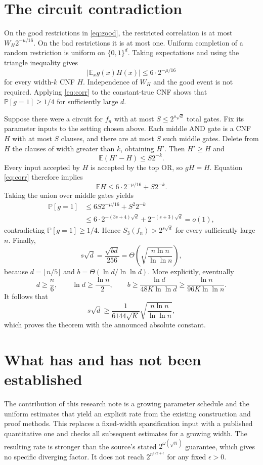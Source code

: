 \documentclass[11pt]{article}
\newcommand{\E}{\mathbb E}
\newcommand{\Prb}{\mathbb P}
\newcommand{\bits}{\{0,1\}}
\begin{document}
\section{The circuit contradiction}

On the good restrictions in \eqref{eq:good}, the restricted correlation
is at most $W_H2^{-\mu/16}$. On the bad restrictions it is at most one.
Uniform completion of a random restriction is uniform on $\bits^d$.
Taking expectations and using the triangle inequality gives
\begin{equation}\label{eq:corr}
 |\E_x g(x)H(x)|\le6\cdot2^{-\mu/16}
\end{equation}
for every width-$k$ CNF $H$. Independence of $W_H$ and the good event
is not required. Applying \eqref{eq:corr} to the constant-true CNF
shows that $\Prb[g=1]\ge1/4$ for sufficiently large $d$.

Suppose there were a circuit for $f_n$ with at most $S\le2^{s\sqrt d}$
total gates. Fix its parameter inputs to the setting chosen above.
Each middle AND gate is a CNF $H$ with at most $S$ clauses, and there
are at most $S$ such middle gates.
Delete from $H$ the clauses of width greater than $k$, obtaining $H'$.
Then $H'\ge H$ and
\[
 \E(H'-H)\le S2^{-k}.
\]
Every input accepted by $H$ is accepted by the top OR, so $gH=H$.
Equation \eqref{eq:corr} therefore implies
\[
 \E H\le6\cdot2^{-\mu/16}+S2^{-k}.
\]
Taking the union over middle gates yields
\begin{align*}
 \Prb[g=1]
 &\le6S2^{-\mu/16}+S^2 2^{-k}\\
 &\le6\cdot2^{-(3s+4)\sqrt d}
             +2^{-(s+3)\sqrt d}=o(1),
\end{align*}
contradicting $\Prb[g=1]\ge1/4$.
Hence $S_3(f_n)>2^{s\sqrt d}$ for every sufficiently large $n$.
Finally,
\[
s\sqrt d=\frac{\sqrt{bd}}{256}
       =\Theta\!\left(\sqrt{\frac{n\ln n}{\ln\ln n}}\right),
\]
because $d=\lfloor n/5\rfloor$ and
$b=\Theta(\ln d/\ln\ln d)$. More explicitly, eventually
\[
 d\ge\frac n6,\qquad \ln d\ge\frac{\ln n}{2},\qquad
 b\ge\frac{\ln d}{48K\ln\ln d}
   \ge\frac{\ln n}{96K\ln\ln n}.
\]
It follows that
\[
 s\sqrt d\ge\frac1{6144\sqrt K}
                 \sqrt{\frac{n\ln n}{\ln\ln n}},
\]
which proves the theorem with the announced absolute constant.

\section{What has and has not been established}

The contribution of this research note is a growing parameter schedule and
the uniform estimates that yield an explicit rate from the existing
construction and proof methods. This replaces a fixed-width sparsification
input with a published quantitative one and checks all subsequent estimates
for a growing width. The resulting rate is stronger than the
source's stated $2^{\omega(\sqrt n)}$ guarantee, which gives no specific
diverging factor. It does not reach $2^{n^{1/2+\epsilon}}$ for any fixed
$\epsilon>0$.
\end{document}
